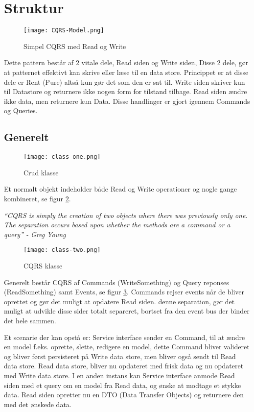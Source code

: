 \section{Struktur}

\begin{figure}[H]
	\center
	\texttt{[image: CQRS-Model.png]}
	\caption{Simpel CQRS med Read og Write}
	\label{fig:cqrs-model}
\end{figure}

Dette pattern består af 2 vitale dele, Read siden og Write siden, Disse 2 dele, gør at patternet effektivt kan skrive eller læse til en data store. Princippet er at disse dele er Rent (Pure) altså kun gør det som den er sat til. Write siden skriver kun til Datastore og returnere ikke nogen form for tilstand tilbage. Read siden ændre ikke data, men returnere kun Data. Disse handlinger er gjort igennem Commands og Queries.

\subsection{Generelt}

\begin{figure}[H]
	\center
	\texttt{[image: class-one.png]}
	\caption{Crud klasse}
	\label{fig:class-one}
\end{figure}

Et normalt objekt indeholder både Read og Write operationer og nogle gange kombineret, se figur \ref{fig:class-one}.

\textit{``CQRS is simply the creation of two objects where there was previously only one. The separation occurs based upon whether the methods are a command or a query'' - Greg Young}

\begin{figure}[H]
	\center
	\texttt{[image: class-two.png]}
	\caption{CQRS klasse}
	\label{fig:class-two}
\end{figure}

Generelt består CQRS af Commands (WriteSomething) og Query reponses (ReadSomething) samt Events, se figur \ref{fig:class-two}. Commands rejser events når de bliver oprettet og gør det muligt at opdatere Read siden. denne separation, gør det muligt at udvikle disse sider totalt separeret, bortset fra den event bus der binder det hele sammen.

Et scenarie der kan opstå er: Service interface sender en Command, til at ændre en model f.eks. oprette, slette, redigere en model, dette Command bliver valideret og bliver først persisteret på Write data store, men bliver også sendt til Read data store. Read data store, bliver nu opdateret med frisk data og nu opdateret med Write data store. I en anden instans kan Service interface anmode Read siden med et query om en model fra Read data, og ønske at modtage et stykke data. Read siden opretter nu en DTO (Data Transfer Objects) og returnere den med det ønskede data.
